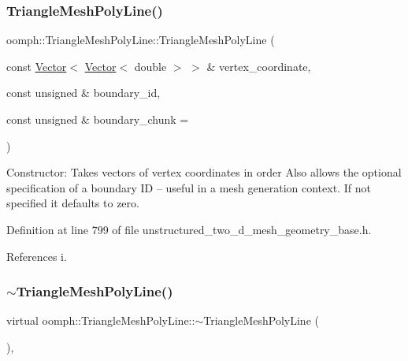 \subsubsection{\texorpdfstring{Triangle\+Mesh\+Poly\+Line()}{TriangleMeshPolyLine()}}
{\footnotesize\ttfamily oomph\+::\+Triangle\+Mesh\+Poly\+Line\+::\+Triangle\+Mesh\+Poly\+Line (\begin{DoxyParamCaption}\item[{const \hyperlink{classoomph_1_1Vector}{Vector}$<$ \hyperlink{classoomph_1_1Vector}{Vector}$<$ double $>$ $>$ \&}]{vertex\+\_\+coordinate,  }\item[{const unsigned \&}]{boundary\+\_\+id,  }\item[{const unsigned \&}]{boundary\+\_\+chunk = {} }\end{DoxyParamCaption})\hspace{0.3cm}{\ttfamily [inline]}}



Constructor\+: Takes vectors of vertex coordinates in order Also allows the optional specification of a boundary ID -- useful in a mesh generation context. If not specified it defaults to zero. 



Definition at line 799 of file unstructured\+\_\+two\+\_\+d\+\_\+mesh\+\_\+geometry\+\_\+base.\+h.



References i.

\mbox{\label{classoomph_1_1TriangleMeshPolyLine_a7a2de094f944f5114002af38c98e59ce}} 
\subsubsection{\texorpdfstring{$\sim$\+Triangle\+Mesh\+Poly\+Line()}{~TriangleMeshPolyLine()}}
{\footnotesize\ttfamily virtual oomph\+::\+Triangle\+Mesh\+Poly\+Line\+::$\sim$\+Triangle\+Mesh\+Poly\+Line (\begin{DoxyParamCaption}{ }\end{DoxyParamCaption})\hspace{0.3cm}{\ttfamily [inline]}, {\ttfamily [virtual]}}




